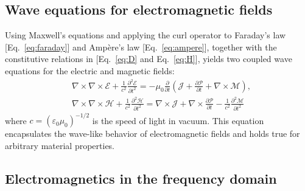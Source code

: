 \subsection*{Wave equations for electromagnetic fields}

Using Maxwell's equations and applying the curl operator to Faraday's law
    [Eq.~\eqref{eq:faraday}] and Ampère's law [Eq.~\eqref{eq:ampere}],
together with the constitutive relations in [Eq.~\eqref{eq:D} and
        Eq.~\eqref{eq:H}], yields two coupled
wave equations for the electric and magnetic fields:
\begin{equation}
    \begin{aligned}
         & \nabla \times \nabla \times \bm{\mathcal{E}}+\frac{1}{c^2}
        \frac{\partial^2 \bm{\mathcal{E}}}{\partial t^2}=-\mu_0
        \frac{\partial}{\partial t}\left(\bm{\mathcal{J}}+\frac{\partial
        \bm{\mathcal{P}}}{\partial t}+\nabla \times \bm{\mathcal{M}}\right), \\
         & \nabla \times \nabla \times \bm{\mathcal{H}}+\frac{1}{c^2}
        \frac{\partial^2 \bm{\mathcal{H}}}{\partial t^2}=\nabla \times
        \bm{\mathcal{J}}+\nabla \times \frac{\partial \bm{\mathcal{P}}}{\partial
            t}-\frac{1}{c^2} \frac{\partial^2 \bm{\mathcal{M}}}{\partial t^2}
    \end{aligned}
\end{equation}
where $c=(\varepsilon_0 \mu_0)^{-1/2}$ is the speed of light in vacuum. This
equation encapsulates the wave-like behavior of electromagnetic fields and
holds true for arbitrary material properties.

\subsection*{Electromagnetics in the frequency domain}

